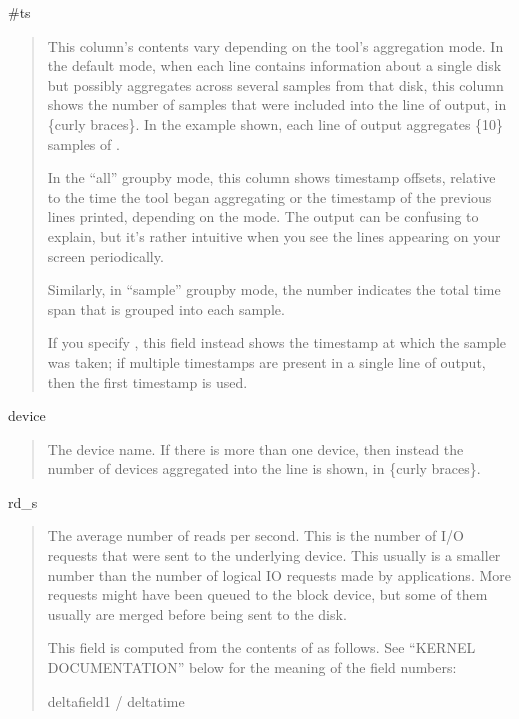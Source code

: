 \documentclass[letterpaper,10pt,english]{sphinxmanual}
\begin{document}
\sphinxAtStartPar
\#ts
\begin{quote}

\sphinxAtStartPar
This column’s contents vary depending on the tool’s aggregation mode.  In the
default mode, when each line contains information about a single disk but
possibly aggregates across several samples from that disk, this column shows the
number of samples that were included into the line of output, in \{curly braces\}.
In the example shown, each line of output aggregates \{10\} samples of
.

\sphinxAtStartPar
In the “all” group\sphinxhyphen{}by mode, this column shows timestamp offsets, relative to the
time the tool began aggregating or the timestamp of the previous lines printed,
depending on the mode.  The output can be confusing to explain, but it’s rather
intuitive when you see the lines appearing on your screen periodically.

\sphinxAtStartPar
Similarly, in “sample” group\sphinxhyphen{}by mode, the number indicates the total time span
that is grouped into each sample.

\sphinxAtStartPar
If you specify {\hyperref[\detokenize{mariadb-iostat:cmdoption-mariadb-iostat-show-timestamps}]{}}, this field instead shows the timestamp at
which the sample was taken; if multiple timestamps are present in a single line
of output, then the first timestamp is used.
\end{quote}

\sphinxAtStartPar
device
\begin{quote}

\sphinxAtStartPar
The device name.  If there is more than one device, then instead the number
of devices aggregated into the line is shown, in \{curly braces\}.
\end{quote}

\sphinxAtStartPar
rd\_s
\begin{quote}

\sphinxAtStartPar
The average number of reads per second.  This is the number of I/O requests that
were sent to the underlying device.  This usually is a smaller number than the
number of logical IO requests made by applications.  More requests might have
been queued to the block device, but some of them usually are merged before
being sent to the disk.

\sphinxAtStartPar
This field is computed from the contents of  as follows.  See
“KERNEL DOCUMENTATION” below for the meaning of the field numbers:

\begin{sphinxVerbatim}[commandchars=\\\{\}]
delta\PYG{o}{[}field1\PYG{o}{]} / delta\PYG{o}{[}time\PYG{o}{]}
\end{sphinxVerbatim}
\end{quote}
\end{document}
